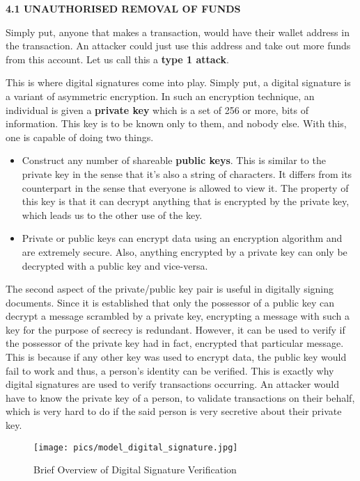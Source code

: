 \documentclass[12pt,a4paper]{report}
\begin{document}
\begin{flushleft}
\textbf{4.1 UNAUTHORISED REMOVAL OF FUNDS}
\vspace{10mm}

Simply put, anyone that makes a transaction, would have their wallet address in the transaction. An attacker could just use this address and take out more funds from this account. Let us call this a \textbf{type 1 attack}. \newline

This is where digital signatures come into play. Simply put, a digital signature is a variant of asymmetric encryption. In such an encryption technique, an individual is given a \textbf{private key} which is a set of 256 or more, bits of information. This key is to be known only to them, and nobody else. With this, one is capable of doing two things. 
\begin{itemize}
    \item Construct any number of shareable \textbf{public keys}. This is similar to the private key in the sense that it's also a string of characters. It differs from its counterpart in the sense that everyone is allowed to view it. The property of this key is that it can decrypt anything that is encrypted by the private key, which leads us to the other use of the key.
    \item Private or public keys can encrypt data using an encryption algorithm and are extremely secure. Also, anything encrypted by a private key can only be decrypted with a public key and vice-versa.
\end{itemize}
The second aspect of the private/public key pair is useful in digitally signing documents. Since it is established that only the possessor of a public key can decrypt a message scrambled by a private key, encrypting a message with such a key for the purpose of secrecy is redundant. \newline
However, it can be used to verify if the possessor of the private key had in fact, encrypted that particular message. This is because if any other key was used to encrypt data, the public key would fail to work and thus, a person's identity can be verified.
This is exactly why digital signatures are used to verify transactions occurring.
An attacker would have to know the private key of a person, to validate transactions on their behalf, which is very hard to do if the said person is very secretive about their private key.

\begin{figure}[h]
\centering
\caption{Brief Overview of Digital Signature Verification}
\texttt{[image: pics/model\_digital\_signature.jpg]}
\end{figure}
\vspace{10mm}


\end{flushleft}
\end{document}
